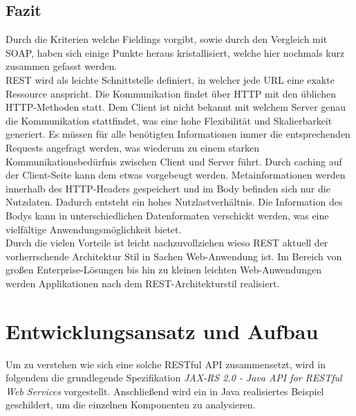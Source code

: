 \documentclass[fleqn,10.5pt,ngerman]{SelfArx}
\begin{document}
\subsection{Fazit}
Durch die Kriterien welche Fieldings vorgibt, sowie durch den Vergleich mit SOAP, haben sich einige Punkte heraus kristallisiert, welche hier nochmals kurz zusammen gefasst werden. \\ REST wird als leichte Schnittstelle definiert, in welcher jede URL eine exakte Ressource anspricht. Die Kommunikation findet über HTTP mit den üblichen HTTP-Methoden statt. Dem Client ist nicht bekannt mit welchem Server genau die Kommunikation stattfindet, was eine hohe Flexibilität und Skalierbarkeit generiert. Es müssen für alle benötigten Informationen immer die entsprechenden Requests angefragt werden, was wiederum zu einem starken Kommunikationsbedürfnis zwischen Client und Server führt. Durch caching auf der Client-Seite kann dem etwas vorgebeugt werden. Metainformationen werden innerhalb des HTTP-Headers gespeichert und im Body befinden sich nur die Nutzdaten. Dadurch entsteht ein hohes Nutzlastverhältnis. Die Information des Bodys kann in unterschiedlichen Datenformaten verschickt werden, was eine vielfältige Anwendungsmöglichkeit bietet. \\ Durch die vielen Vorteile ist leicht nachzuvollziehen wieso REST aktuell der vorherrschende Architektur Stil in Sachen Web-Anwendung ist. Im Bereich von großen Enterprise-Lösungen bis hin zu kleinen leichten Web-Anwendungen werden Applikationen nach dem REST-Architekturstil realisiert. 

\section{Entwicklungsansatz und Aufbau}
Um zu verstehen wie sich eine solche RESTful API zusammensetzt, wird in folgendem die grundlegende Spezifikation \textit{JAX-RS 2.0 - Java API for RESTful Web Services} vorgestellt. Anschließend wird ein in Java realisiertes Beispiel geschildert, um die einzelnen Komponenten zu analysieren. 
\end{document}
